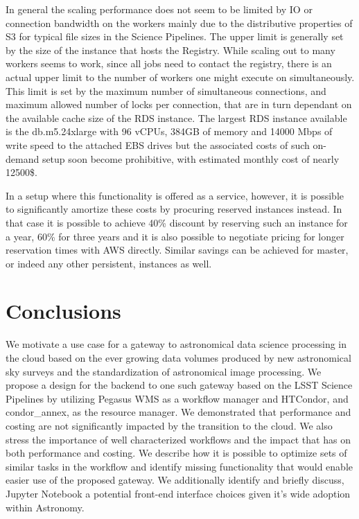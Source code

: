 \documentclass[a4paper, 10pt, conference]{ieeeconf}
\begin{document}
In general the scaling performance does not seem to be limited by IO or connection bandwidth on the workers mainly due to the distributive properties of S3 for typical file sizes in the Science Pipelines. The upper limit is generally set by the size of the instance that hosts the Registry. While scaling out to many workers seems to work, since all jobs need to contact the registry, there is an actual upper limit to the number of workers one might execute on simultaneously. This limit is set by the maximum number of simultaneous connections, and maximum allowed number of locks per connection, that are in turn dependant on the available cache size of the RDS instance. The largest RDS instance available is the db.m5.24xlarge with 96 vCPUs, 384GB of memory and 14000 Mbps of write speed to the attached EBS drives but the associated costs of such on-demand setup soon become prohibitive, with estimated monthly cost of nearly 12500\$. 

In a setup where this functionality is offered as a service, however, it is possible to significantly amortize these costs by procuring reserved instances instead. In that case it is possible to achieve 40\% discount by reserving such an instance for a year, 60\% for three years and it is also possible to negotiate pricing for longer reservation times with AWS directly. Similar savings can be achieved for master, or indeed any other persistent, instances as well. 

\section{Conclusions}

We motivate a use case for a gateway to astronomical data science processing in the cloud based on the ever growing data volumes produced by new astronomical sky surveys and the standardization of astronomical image processing. We propose a design for the backend to one such gateway based on the LSST Science Pipelines by utilizing Pegasus WMS as a workflow manager and HTCondor, and condor\_annex, as the resource manager. We demonstrated that performance and costing are not significantly impacted by the transition to the cloud. We also stress the importance of well characterized workflows and the impact that has on both performance and costing. We describe how it is possible to optimize sets of similar tasks in the workflow and identify missing functionality that would enable easier use of the proposed gateway. We additionally identify and briefly discuss, Jupyter Notebook a potential front-end interface choices given it's wide adoption within Astronomy. 
\end{document}
